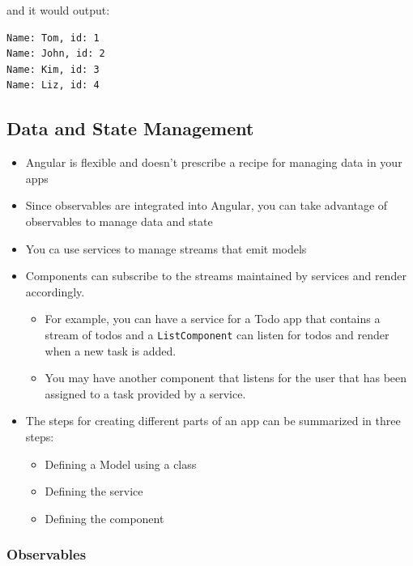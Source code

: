 \documentclass[12pt,]{article}
\providecommand{\tightlist}{%
  \setlength{\itemsep}{0pt}\setlength{\parskip}{0pt}}
\begin{document}
and it would output:

\begin{verbatim}
Name: Tom, id: 1
Name: John, id: 2
Name: Kim, id: 3
Name: Liz, id: 4
\end{verbatim}

\subsection{Data and State Management}\label{data-and-state-management}

\begin{itemize}
\tightlist
\item
  Angular is flexible and doesn't prescribe a recipe for managing data
  in your apps
\item
  Since observables are integrated into Angular, you can take advantage
  of observables to manage data and state
\item
  You ca use services to manage streams that emit models
\item
  Components can subscribe to the streams maintained by services and
  render accordingly.

  \begin{itemize}
  \tightlist
  \item
    For example, you can have a service for a Todo app that contains a
    stream of todos and a \texttt{ListComponent} can listen for todos
    and render when a new task is added.
  \item
    You may have another component that listens for the user that has
    been assigned to a task provided by a service.
  \end{itemize}
\item
  The steps for creating different parts of an app can be summarized in
  three steps:

  \begin{itemize}
  \tightlist
  \item
    Defining a Model using a class
  \item
    Defining the service
  \item
    Defining the component
  \end{itemize}
\end{itemize}

\subsubsection{Observables}\label{observables}
\end{document}
